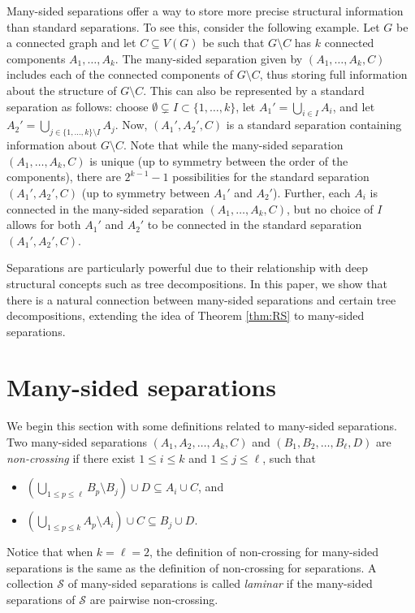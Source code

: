 \documentclass[12pt]{amsart}
\renewcommand{\S}{\mathcal{S}}
\begin{document}
Many-sided separations offer a way to store more precise structural information than standard separations. To see this, consider the following example. Let $G$ be a connected graph and let $C \subseteq V(G)$ be such that $G \setminus C$ has $k$ connected components $A_1, \hdots, A_k$. The many-sided separation given by $(A_1, \hdots, A_k, C)$ includes each of the connected components of $G \setminus C$, thus storing full information about the structure of $G \setminus C$. This can also be represented by a standard separation as follows: choose $\emptyset \subsetneq I \subset \{1, \hdots, k\}$, let $A_1' = \bigcup_{i \in I} A_i$, and let $A_2' = \bigcup_{j \in \{1, \hdots, k\} \setminus I} A_j$. Now, $(A_1', A_2', C)$ is a standard separation containing information about $G \setminus C$. Note that while the many-sided separation $(A_1, \hdots, A_k, C)$ is unique (up to symmetry between the order of the components), there are $2^{k-1} - 1$ possibilities for the standard separation $(A_1', A_2', C)$ (up to symmetry between $A_1'$ and $A_2'$). Further, each $A_i$ is connected in the many-sided separation $(A_1, \hdots, A_k, C)$, but no choice of $I$ allows for both $A_1'$ and $A_2'$ to be connected in the standard separation $(A_1', A_2', C)$. 

Separations are particularly powerful due to their relationship with deep structural concepts such as tree decompositions. In this paper, we show that there is a natural connection between many-sided separations and certain tree decompositions, extending the idea of Theorem \ref{thm:RS} to many-sided separations.  


\section{Many-sided separations} 

We begin this section with some definitions related to many-sided separations. Two many-sided separations $(A_1, A_2, \hdots, A_k, C)$ and $(B_1, B_2, \hdots, B_\ell, D)$ are {\em non-crossing} if there exist $1 \leq i \leq k$ and $1 \leq j \leq \ell$, such that 
\begin{itemize} 

\item $\left(\bigcup_{1 \leq p \leq \ell} B_p \setminus B_j\right) \cup D \subseteq A_i \cup C$, and 
\item $\left(\bigcup_{1 \leq p \leq k} A_p \setminus A_i\right) \cup C \subseteq B_j \cup D$. 
\end{itemize}
Notice that when $k = \ell = 2$, the definition of non-crossing for many-sided separations is the same as the definition of non-crossing for separations. A collection $\S$ of many-sided separations is called {\em laminar} if the many-sided separations of $\S$ are pairwise non-crossing. 
\end{document}
